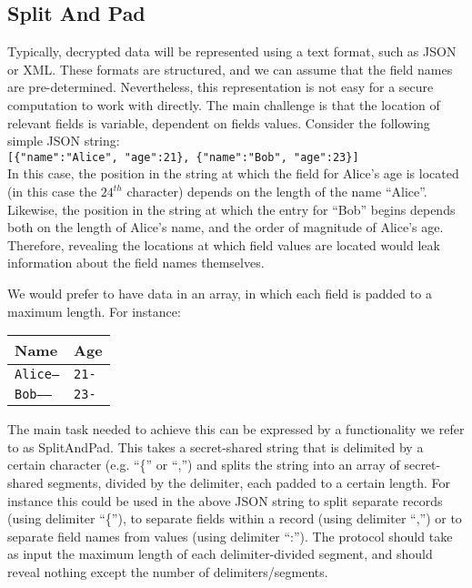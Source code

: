 \subsection{Split And Pad}

Typically, decrypted data will be represented using a text format,
such as JSON or XML.
These formats are structured, and we can assume that the field names are 
pre-determined.
Nevertheless, this representation is not easy for a secure computation 
to work with directly.
The main challenge is that the location of relevant fields is variable,
dependent on fields values. 
Consider the following simple JSON string:\\
\texttt{[\{"name":"Alice", "age":21\}, \{"name":"Bob", "age":23\}]}\\
In this case, the position in the string at which the field for Alice's age 
is located (in this case the $24^{th}$ character) 
depends on the length of the name ``Alice''. 
Likewise, the position in the string at which the entry for ``Bob'' begins
depends both on the length of Alice's name, and the order of magnitude
of Alice's age.
Therefore, revealing the locations at which field values are located
would leak information about the field names themselves.

We would prefer to have data in an array, in which each field is padded to 
a maximum length. For instance:

\begin{tabular}{|l|l|}
	\hline
	Name			&  Age	 \\ \hline
	\texttt{Alice---}	&  \texttt{21-}  \\ \hline
	\texttt{Bob-----}	&  \texttt{23-}	 \\ \hline
\end{tabular}

The main task needed to achieve this can be expressed by a 
functionality we refer to as SplitAndPad.
This takes a secret-shared string that is delimited by a certain character 
(e.g. ``\{'' or ``,'') and splits the string into an array of secret-shared segments,
divided by the delimiter, each padded to a certain length.
For instance this could be used in the above JSON string to split separate
records (using delimiter ``\{''),
to separate fields within a record (using delimiter ``,'') 
or to separate field names from values (using delimiter ``:'').
The protocol should take as input the maximum length of each delimiter-divided
segment, and should reveal nothing except the number of delimiters/segments.

